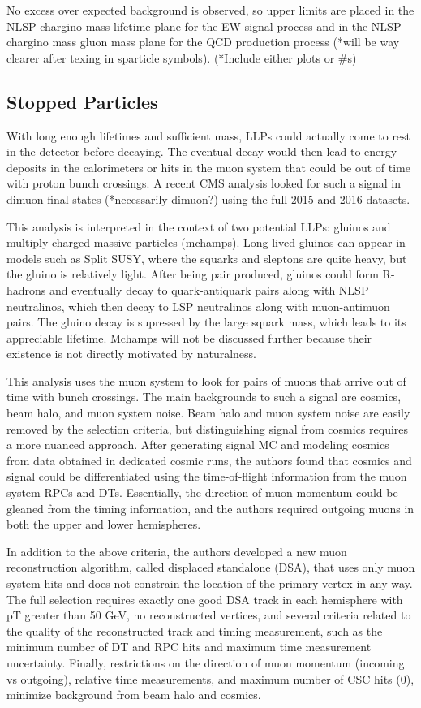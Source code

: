 \documentclass[12pt]{article}
\begin{document}
    No excess over expected background is observed, so upper limits are placed in the NLSP chargino mass-lifetime plane for the EW signal process and in the NLSP chargino mass gluon mass plane for the QCD production process (*will be way clearer after texing in sparticle symbols). (*Include either plots or \#s)

\subsection{Stopped Particles}
    With long enough lifetimes and sufficient mass, LLPs could actually come to rest in the detector before decaying. The eventual decay would then lead to energy deposits in the calorimeters or hits in the muon system that could be out of time with proton bunch crossings. A recent CMS analysis looked for such a signal in dimuon final states (*necessarily dimuon?) using the full 2015 and 2016 datasets. 

    This analysis is interpreted in the context of two potential LLPs: gluinos and multiply charged massive particles (mchamps). Long-lived gluinos can appear in models such as Split SUSY, where the squarks and sleptons are quite heavy, but the gluino is relatively light. After being pair produced, gluinos could form R-hadrons and eventually decay to quark-antiquark pairs along with NLSP neutralinos, which then decay to LSP neutralinos along with muon-antimuon pairs. The gluino decay is supressed by the large squark mass, which leads to its appreciable lifetime. Mchamps will not be discussed further because their existence is not directly motivated by naturalness.

    This analysis uses the muon system to look for pairs of muons that arrive out of time with bunch crossings. The main backgrounds to such a signal are cosmics, beam halo, and muon system noise. Beam halo and muon system noise are easily removed by the selection criteria, but distinguishing signal from cosmics requires a more nuanced approach. After generating signal MC and modeling cosmics from data obtained in dedicated cosmic runs, the authors found that cosmics and signal could be differentiated using the time-of-flight information from the muon system RPCs and DTs. Essentially, the direction of muon momentum could be gleaned from the timing information, and the authors required outgoing muons in both the upper and lower hemispheres.
    
    In addition to the above criteria, the authors developed a new muon reconstruction algorithm, called displaced standalone (DSA), that uses only muon system hits and does not constrain the location of the primary vertex in any way. The full selection requires exactly one good DSA track in each hemisphere with pT greater than 50 GeV, no reconstructed vertices, and several criteria related to the quality of the reconstructed track and timing measurement, such as the minimum number of DT and RPC hits and maximum time measurement uncertainty. Finally, restrictions on the direction of muon momentum (incoming vs outgoing), relative time measurements, and maximum number of CSC hits (0), minimize background from beam halo and cosmics.
\end{document}
